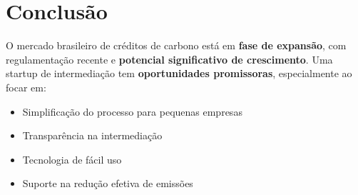 \documentclass[a4paper,12pt]{article}
\begin{document}
\section{Conclusão}

O mercado brasileiro de créditos de carbono está em \textbf{fase de expansão}, com regulamentação recente e \textbf{potencial significativo de crescimento}. Uma startup de intermediação tem \textbf{oportunidades promissoras}, especialmente ao focar em:
\begin{itemize}
    \item Simplificação do processo para pequenas empresas
    \item Transparência na intermediação
    \item Tecnologia de fácil uso
    \item Suporte na redução efetiva de emissões
\end{itemize}
\end{document}
